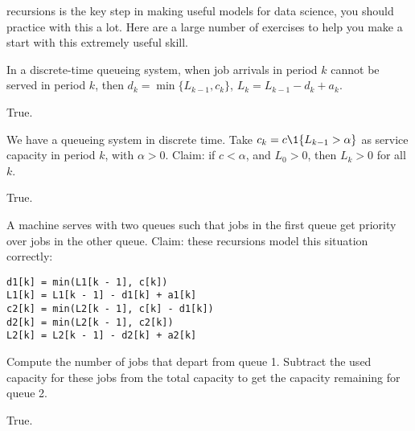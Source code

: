 \documentclass[stochastic-or.tex]{subfiles}
\begin{document}
 recursions is the key step in making useful models for data science, you should practice with this a lot.
Here are a large number of exercises to help you make a start with this extremely useful skill.

\begin{truefalse}
In a discrete-time queueing system, when job arrivals in period $k$ cannot be served in period $k$, then $d_k = \min\{L_{k-1}, c_k\}$, $L_k = L_{k-1} -d_k + a_k$.
\begin{solution}
True.
\end{solution}
\end{truefalse}

\begin{truefalse}
We have a queueing system in discrete time.
Take $c_k = c\1{L_{k-1} > \alpha}$ as service capacity in period $k$, with $\alpha>0$.
Claim: if $c < \alpha$, and $L_0 > 0$, then $L_k > 0$ for all $k$.
\begin{solution}
True.
\end{solution}
\end{truefalse}


\begin{truefalse}
 A machine  
serves  with two queues such that jobs in the first queue get priority over jobs in the other queue.
Claim: these recursions model this situation correctly:
\begin{verbatim}
d1[k] = min(L1[k - 1], c[k])
L1[k] = L1[k - 1] - d1[k] + a1[k]
c2[k] = min(L2[k - 1], c[k] - d1[k])
d2[k] = min(L2[k - 1], c2[k])
L2[k] = L2[k - 1] - d2[k] + a2[k]
\end{verbatim}
\begin{hint}
  Compute the number of jobs that depart from queue 1.
  Subtract the used capacity for these jobs from the total capacity to get the capacity remaining for queue 2.
\end{hint}
\begin{solution}
True.
\end{solution}
\end{truefalse}
\end{document}
